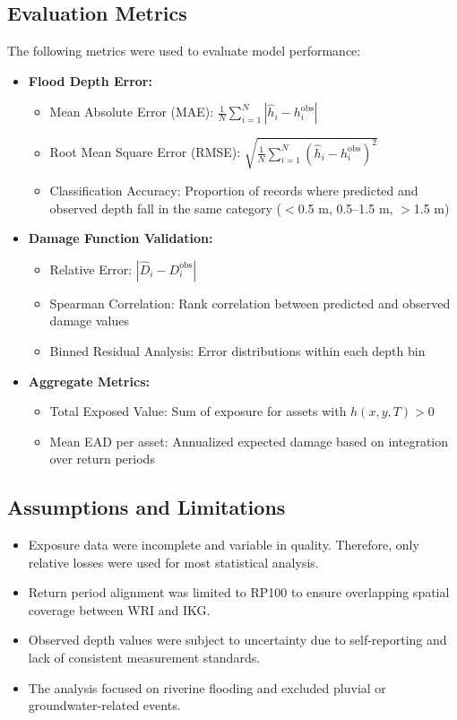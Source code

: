\subsection{Evaluation Metrics}

The following metrics were used to evaluate model performance:

\begin{itemize}
    \item \textbf{Flood Depth Error:}
    \begin{itemize}
        \item Mean Absolute Error (MAE): $\frac{1}{N} \sum_{i=1}^{N} | \widehat{h}_i - h_i^\text{obs} |$
        \item Root Mean Square Error (RMSE): $\sqrt{ \frac{1}{N} \sum_{i=1}^{N} (\widehat{h}_i - h_i^\text{obs})^2 }$
        \item Classification Accuracy: Proportion of records where predicted and observed depth fall in the same category ($<$0.5 m, 0.5–1.5 m, $>$1.5 m)
    \end{itemize}
    
    \item \textbf{Damage Function Validation:}
    \begin{itemize}
        \item Relative Error: $|\widehat{D}_i - D_i^\text{obs}|$
        \item Spearman Correlation: Rank correlation between predicted and observed damage values
        \item Binned Residual Analysis: Error distributions within each depth bin
    \end{itemize}
    
    \item \textbf{Aggregate Metrics:}
    \begin{itemize}
        \item Total Exposed Value: Sum of exposure for assets with $h(x, y, T) > 0$
        \item Mean EAD per asset: Annualized expected damage based on integration over return periods
    \end{itemize}
\end{itemize}

\subsection{Assumptions and Limitations}

\begin{itemize}
    \item Exposure data were incomplete and variable in quality. Therefore, only relative losses were used for most statistical analysis.
    \item Return period alignment was limited to RP100 to ensure overlapping spatial coverage between WRI and IKG.
    \item Observed depth values were subject to uncertainty due to self-reporting and lack of consistent measurement standards.
    \item The analysis focused on riverine flooding and excluded pluvial or groundwater-related events.
\end{itemize}

